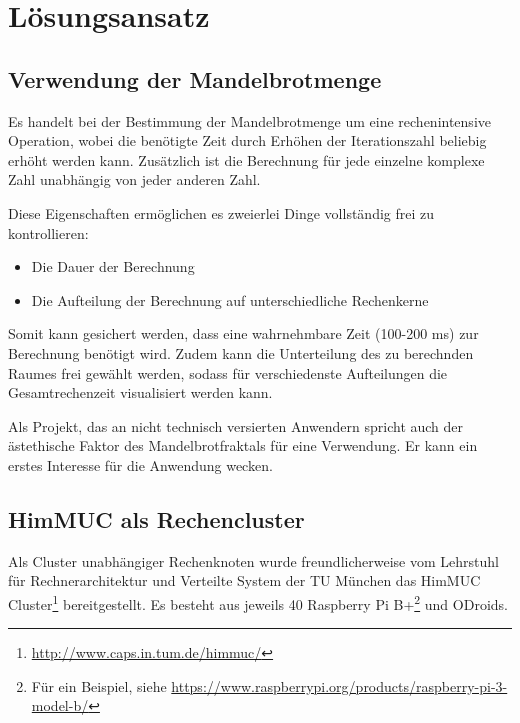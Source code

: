 
\section{Lösungsansatz}

\subsection{Verwendung der Mandelbrotmenge}

Es handelt bei der Bestimmung der Mandelbrotmenge um eine rechenintensive Operation, wobei
die benötigte Zeit durch Erhöhen der Iterationszahl beliebig erhöht werden kann.
Zusätzlich ist die Berechnung für jede einzelne komplexe Zahl unabhängig von
jeder anderen Zahl.

Diese Eigenschaften ermöglichen es zweierlei Dinge vollständig frei zu kontrollieren:
\begin{itemize}
	\item Die Dauer der Berechnung
	\item Die Aufteilung der Berechnung auf unterschiedliche Rechenkerne
\end{itemize}

Somit kann gesichert werden, dass eine wahrnehmbare Zeit (100-200 ms) zur Berechnung benötigt wird.
Zudem kann die Unterteilung des zu berechnden Raumes frei gewählt werden, sodass
für verschiedenste Aufteilungen die Gesamtrechenzeit visualisiert werden kann.

Als Projekt, das an nicht technisch versierten Anwendern spricht auch der ästethische
Faktor des Mandelbrotfraktals für eine Verwendung.
Er kann ein erstes Interesse für die Anwendung wecken.

\subsection{HimMUC als Rechencluster}
Als Cluster unabhängiger Rechenknoten wurde freundlicherweise vom Lehrstuhl für Rechnerarchitektur und Verteilte System der TU München
das HimMUC Cluster\footnote{\url{http://www.caps.in.tum.de/himmuc/}} bereitgestellt.
Es besteht aus jeweils 40 Raspberry Pi B+\footnote{Für ein Beispiel, siehe \url{https://www.raspberrypi.org/products/raspberry-pi-3-model-b/}} und ODroids.

